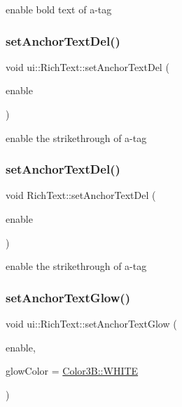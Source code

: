 enable bold text of a-\/tag \mbox{\label{classui_1_1RichText_ab9d69f1f319f4c28620ebf7fed1246ff}} 
\subsubsection{\texorpdfstring{set\+Anchor\+Text\+Del()}{setAnchorTextDel()}\hspace{0.1cm}{\footnotesize\ttfamily [1/2]}}
{\footnotesize\ttfamily void ui\+::\+Rich\+Text\+::set\+Anchor\+Text\+Del (\begin{DoxyParamCaption}\item[{bool}]{enable }\end{DoxyParamCaption})}

enable the strikethrough of a-\/tag \mbox{\label{classui_1_1RichText_ac92f9783c67dbb7f294e917c7019d618}} 
\subsubsection{\texorpdfstring{set\+Anchor\+Text\+Del()}{setAnchorTextDel()}\hspace{0.1cm}{\footnotesize\ttfamily [2/2]}}
{\footnotesize\ttfamily void Rich\+Text\+::set\+Anchor\+Text\+Del (\begin{DoxyParamCaption}\item[{bool}]{enable }\end{DoxyParamCaption})}

enable the strikethrough of a-\/tag \mbox{\label{classui_1_1RichText_a71a3a6d9c9bb3c62b36b5b989b7a3c55}} 
\subsubsection{\texorpdfstring{set\+Anchor\+Text\+Glow()}{setAnchorTextGlow()}\hspace{0.1cm}{\footnotesize\ttfamily [1/2]}}
{\footnotesize\ttfamily void ui\+::\+Rich\+Text\+::set\+Anchor\+Text\+Glow (\begin{DoxyParamCaption}\item[{bool}]{enable,  }\item[{const \hyperlink{structColor3B}{Color3B} \&}]{glow\+Color = {\ttfamily \hyperlink{structColor3B_adf57cb86ca15f434b29215ad471cdc35}{Color3\+B\+::\+W\+H\+I\+TE}} }\end{DoxyParamCaption})}

